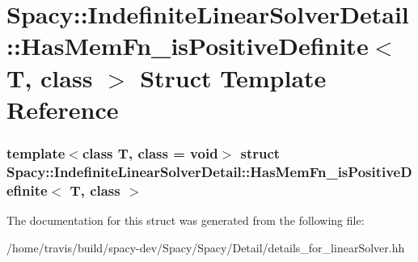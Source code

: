 \hypertarget{structSpacy_1_1IndefiniteLinearSolverDetail_1_1HasMemFn__isPositiveDefinite}{\section{\-Spacy\-:\-:\-Indefinite\-Linear\-Solver\-Detail\-:\-:\-Has\-Mem\-Fn\-\_\-is\-Positive\-Definite$<$ \-T, class $>$ \-Struct \-Template \-Reference}
\label{structSpacy_1_1IndefiniteLinearSolverDetail_1_1HasMemFn__isPositiveDefinite}
}
\subsubsection*{template$<$class T, class = void$>$ struct Spacy\-::\-Indefinite\-Linear\-Solver\-Detail\-::\-Has\-Mem\-Fn\-\_\-is\-Positive\-Definite$<$ T, class $>$}



\-The documentation for this struct was generated from the following file\-:\begin{DoxyCompactItemize}
\item 
/home/travis/build/spacy-\/dev/\-Spacy/\-Spacy/\-Detail/details\-\_\-for\-\_\-linear\-Solver.\-hh\end{DoxyCompactItemize}
